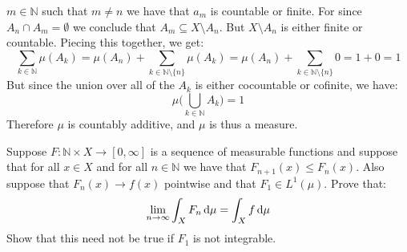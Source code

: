 \documentclass[crop=false,class=article]{standalone}                           %
\begin{document}
\begin{solution}
            $m\in\mathbb{N}$ such that $m\ne{n}$ we have that $a_{m}$ is
            countable or finite. For since $A_{n}\cap{A}_{m}=\emptyset$ we
            conclude that $A_{m}\subseteq{X}\setminus{A}_{n}$. But
            $X\setminus{A}_{n}$ is either finite or countable. Piecing this
            together, we get:
            \begin{equation}
                \sum_{k\in\mathbb{N}}\mu(A_{k})
                =\mu(A_{n})+\sum_{k\in\mathbb{N}\setminus\{n\}}\mu(A_{k})
                =\mu(A_{n})+\sum_{k\in\mathbb{N}\setminus\{n\}}0
                =1+0
                =1
            \end{equation}
            But since the union over all of the $A_{k}$ is either cocountable or
            cofinite, we have:
            \begin{equation}
                \mu\Big(\bigcup_{k\in\mathbb{N}}A_{k}\Big)=1
            \end{equation}
            Therefore $\mu$ is countably additive, and $\mu$ is thus a measure.
        \end{solution}
        \begin{problem}
            Suppose $F:\mathbb{N}\times{X}\rightarrow[0,\infty]$ is a sequence
            of measurable functions and suppose that for all $x\in{X}$ and for
            all $n\in\mathbb{N}$ we have that $F_{n+1}(x)\leq{F}_{n}(x)$. Also
            suppose that $F_{n}(x)\rightarrow{f}(x)$ pointwise and that
            $F_{1}\in{L}^{1}(\mu)$. Prove that:
            \begin{equation}
                \underset{n\rightarrow\infty}{\lim}\int_{X}F_{n}\mathop{}\!\mathrm{d}{\mu}
                =\int_{X}f\mathop{}\!\mathrm{d}{\mu}
            \end{equation}
            Show that this need not be true if $F_{1}$ is not integrable.
        \end{problem}
\end{document}
